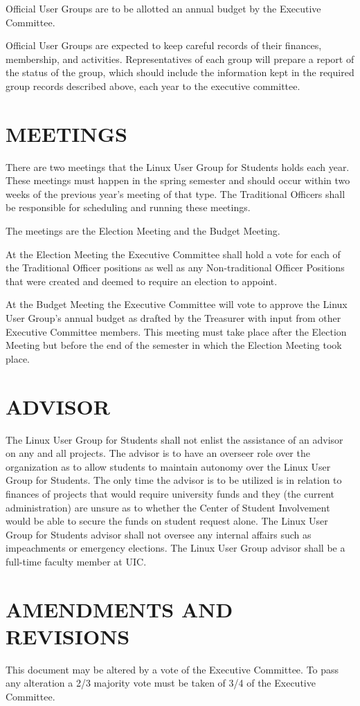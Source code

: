 \documentclass[letter]{report}
\begin{document}
Official User Groups are to be allotted an annual budget by the Executive
Committee.

Official User Groups are expected to keep careful records of their finances,
membership, and activities. Representatives of each group will prepare a report
of the status of the group, which should include the information kept in the
required group records described above, each year to the executive committee.


\chapter{MEETINGS}
There are two meetings that the Linux User Group for Students holds each year. These meetings
must happen in the spring semester and should occur within two weeks of the
previous year's meeting of that type. The Traditional Officers shall be
responsible for scheduling and running these meetings.

The meetings are the Election Meeting and the Budget Meeting.

At the Election Meeting the Executive Committee shall hold a vote for each of
the Traditional Officer positions as well as any Non-traditional Officer
Positions that were created and deemed to require an election to appoint.

At the Budget Meeting the Executive Committee will vote to approve the Linux
User Group's annual budget as drafted by the Treasurer with input from other
Executive Committee members. This meeting must take place after the Election
Meeting but before the end of the semester in which the Election Meeting took
place.


\chapter{ADVISOR}
The Linux User Group for Students shall not enlist the assistance of an advisor on any and
all projects. The advisor is to have an overseer role over the organization as
to allow students to maintain autonomy over the Linux User Group for Students. The only time
the advisor is to be utilized is in relation to finances of projects that would
require university funds and they (the current administration) are unsure as to
whether the Center of Student Involvement would be able to secure the funds on
student request alone. The Linux User Group for Students advisor shall not oversee any
internal affairs such as impeachments or emergency elections. The Linux User
Group advisor shall be a full-time faculty member at UIC.


\chapter{AMENDMENTS AND REVISIONS}
This document may be altered by a vote of the Executive Committee. To pass any
alteration a 2/3 majority vote must be taken of 3/4 of the Executive Committee.
\end{document}
